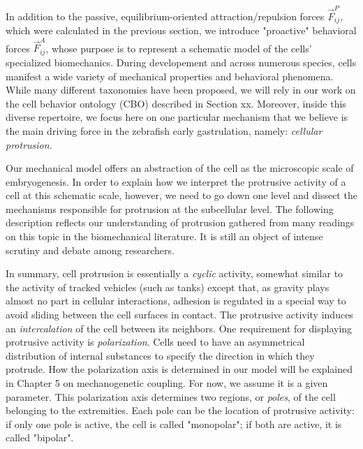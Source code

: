 In addition to the passive, equilibrium-oriented attraction/repulsion forces $\vec{F}^P_{ij}$, which were calculated in the previous section, we introduce "proactive" behavioral forces $\vec{F}^A_{ij}$, whose purpose is to represent a schematic model of the cells' specialized biomechanics. During developement and across numerous species, cells manifest a wide variety of mechanical properties and behavioral phenomena. While many different taxonomies have been proposed, we will rely in our work on the cell behavior ontology (CBO) described in Section xx. Moreover, inside this diverse repertoire, we focus here on one particular mechanism that we believe is the main driving force in the zebrafish early gastrulation, namely: \textit{cellular protrusion}.

Our mechanical model offers an abstraction of the cell as the microscopic scale of embryogenesis. In order to explain how we interpret the protrusive activity of a cell at this schematic scale, however, we need to go down one level and dissect the mechanisms responsible for protrusion at the subcellular level. The following description reflects our understanding of protrusion gathered from many readings on this topic in the biomechanical literature. It is still an object of intense scrutiny and debate among researchers.

In summary, cell protrusion is essentially a \textit{cyclic} activity, somewhat similar to the activity of tracked vehicles (such as tanks) except that, as gravity plays almost no part in cellular interactions, adhesion is regulated in a special way to avoid sliding between the cell surfaces in contact. The protrusive activity induces an \textit{intercalation} of the cell between its neighbors. One requirement for displaying protrusive activity is \textit{polarization}. Cells need to have an asymmetrical distribution of internal substances to specify the direction in which they protrude. How the polarization axis is determined in our model will be explained in Chapter 5 on mechanogenetic coupling. For now, we assume it is a given parameter. This polarization axis determines two regions, or \textit{poles}, of the cell belonging to the extremities. Each pole can be the location of protrusive activity: if only one pole is active, the cell is called "monopolar"; if both are active, it is called "bipolar".


